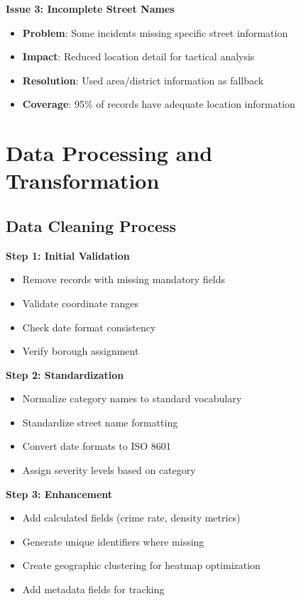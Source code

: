 \documentclass[12pt,a4paper]{article}
\begin{document}
\textbf{Issue 3: Incomplete Street Names}
\begin{itemize}
    \item \textbf{Problem}: Some incidents missing specific street information
    \item \textbf{Impact}: Reduced location detail for tactical analysis
    \item \textbf{Resolution}: Used area/district information as fallback
    \item \textbf{Coverage}: 95\% of records have adequate location information
\end{itemize}

\section{Data Processing and Transformation}

\subsection{Data Cleaning Process}

\textbf{Step 1: Initial Validation}
\begin{itemize}
    \item Remove records with missing mandatory fields
    \item Validate coordinate ranges
    \item Check date format consistency
    \item Verify borough assignment
\end{itemize}

\textbf{Step 2: Standardization}
\begin{itemize}
    \item Normalize category names to standard vocabulary
    \item Standardize street name formatting
    \item Convert date formats to ISO 8601
    \item Assign severity levels based on category
\end{itemize}

\textbf{Step 3: Enhancement}
\begin{itemize}
    \item Add calculated fields (crime rate, density metrics)
    \item Generate unique identifiers where missing
    \item Create geographic clustering for heatmap optimization
    \item Add metadata fields for tracking
\end{itemize}
\end{document}
